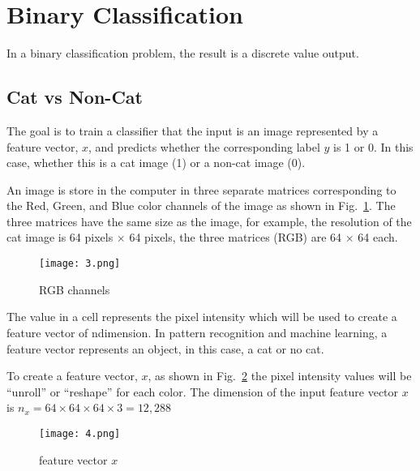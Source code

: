 \documentclass[a4paper]{article}
\begin{document}
\section{Binary Classification}
In a binary classification problem, the result is a discrete value output.
\subsection{Cat vs Non-Cat}
The goal is to train a classifier that the input is an image represented by a feature vector, $x$, and predicts whether the corresponding label $y$ is 1 or 0. In this case, whether this is a cat image (1) or a non-cat image (0).
\par
An image is store in the computer in three separate matrices corresponding to the Red, Green, and Blue color channels of the image as shown in Fig.~\ref{fig3}. The three matrices have the same size as the image, for example, the resolution of the cat image is 64 pixels $\times$ 64 pixels, the three matrices (RGB) are 64 $\times$ 64 each.
\begin{figure}[h]
  \centering
  \texttt{[image: 3.png]}\\
  \caption{RGB channels}\label{fig3}
\end{figure}
The value in a cell represents the pixel intensity which will be used to create a feature vector of ndimension. In pattern recognition and machine learning, a feature vector represents an object, in this case, a cat or no cat.
\par
To create a feature vector, $x$, as shown in Fig.~\ref{fig4} the pixel intensity values will be ``unroll'' or ``reshape'' for each color. The dimension of the input feature vector $x$ is $n_x = 64 \times 64 \times 64 \times 3 = 12,288$
\begin{figure}[htbp]
  \centering
  \texttt{[image: 4.png]}\\
  \caption{feature vector $x$}\label{fig4}
\end{figure}
\end{document}
